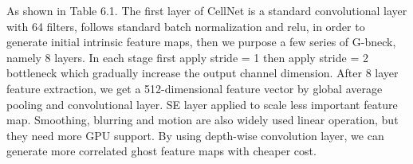 As shown in Table 6.1. The first layer of CellNet is a standard convolutional layer with 64 filters, follows standard batch normalization and relu, in order to generate initial intrinsic feature maps, then we purpose a few series of G-bneck, namely 8 layers. In each stage first apply stride = 1 then apply stride = 2 bottleneck which gradually increase the output channel dimension. After 8 layer feature extraction, we get a 512-dimensional feature vector by global average pooling and convolutional layer. SE layer applied to scale less important feature map. Smoothing, blurring and motion are also widely used linear operation, but they need more GPU support. By using depth-wise convolution layer, we can generate more correlated ghost feature maps with cheaper cost.
\begin{table}[htbp]
\centering


\end{table}
